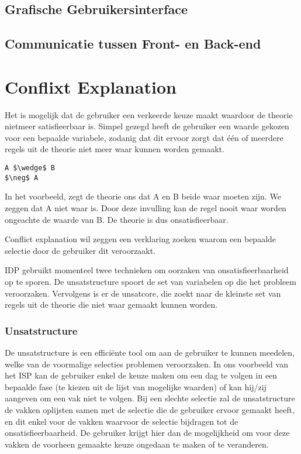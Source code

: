 \subsection{Grafische Gebruikersinterface}

\subsection{Communicatie tussen Front- en Back-end}

\section{Conflixt Explanation}
Het is mogelijk dat de gebruiker een verkeerde keuze maakt waardoor de theorie nietmeer satisfieerbaar is. Simpel gezegd heeft de gebruiker een waarde gekozen voor een bepaalde variabele, zodanig dat dit ervoor zorgt dat \'{e}\'{e}n of meerdere regels uit de theorie niet meer waar kunnen worden gemaakt.

\begin{lstlisting}[mathescape]
A $\wedge$ B
$\neg$ A
\end{lstlisting}

In het voorbeeld, zegt de theorie ons dat A en B beide waar moeten zijn. We zeggen dat A niet waar is. Door deze invulling kan de regel nooit waar worden ongeachte de waarde van B. De theorie is dus onsatisfieerbaar. 

Conflict explanation wil zeggen een verklaring zoeken waarom een bepaalde selectie door de gebruiker dit veroorzaakt. 

IDP gebruikt momenteel twee technieken om oorzaken van onsatisfieerbaarheid op te sporen. De unsatstructure spoort de set van variabelen op die het probleem veroorzaken. Vervolgens is er de unsatcore, die zoekt naar de kleinste set van regels uit de theorie die niet waar gemaakt kunnen worden.

\subsubsection{Unsatstructure}
De unsatstructure is een effici\"{e}nte tool om aan de gebruiker te kunnen meedelen, welke van de voormalige selecties problemen veroorzaken. In ons voorbeeld van het ISP kan de gebruiker enkel de keuze maken om een dag te volgen in een bepaalde fase (te kiezen uit de lijst van mogelijke waarden) of kan hij/zij aangeven om een vak niet te volgen. 
Bij een slechte selectie zal de unsatstructure de vakken oplijsten samen met de selectie die de gebruiker ervoor gemaakt heeft, en dit enkel voor de vakken waarvoor de selectie bijdragen tot de onsatisfieerbaarheid. De gebruiker krijgt hier dan de mogelijkheid om voor deze vakken de voorheen gemaakte keuze ongedaan te maken of te veranderen. 

